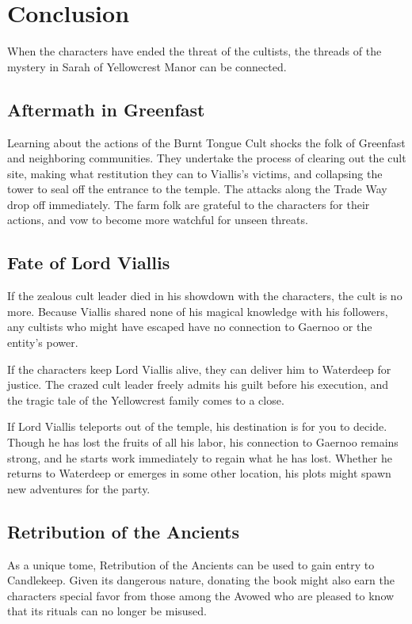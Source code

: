 \documentclass[10pt,a4paper,twoside,bg=print,twocolumn,openany,nodeprecatedcode]{dndbook}
\begin{document}
\section{Conclusion}
When the characters have ended the threat of the cultists, the threads of the mystery in Sarah of Yellowcrest Manor can be connected.

\subsection{Aftermath in Greenfast}
Learning about the actions of the Burnt Tongue Cult shocks the folk of Greenfast and neighboring communities. They undertake the process of clearing out the cult site, making what restitution they can to Viallis's victims, and collapsing the tower to seal off the entrance to the temple. The attacks along the Trade Way drop off immediately. The farm folk are grateful to the characters for their actions, and vow to become more watchful for unseen threats.

\subsection{Fate of Lord Viallis}
If the zealous cult leader died in his showdown with the characters, the cult is no more. Because Viallis shared none of his magical knowledge with his followers, any cultists who might have escaped have no connection to Gaernoo or the entity's power.

If the characters keep Lord Viallis alive, they can deliver him to Waterdeep for justice. The crazed cult leader freely admits his guilt before his execution, and the tragic tale of the Yellowcrest family comes to a close.

If Lord Viallis teleports out of the temple, his destination is for you to decide. Though he has lost the fruits of all his labor, his connection to Gaernoo remains strong, and he starts work immediately to regain what he has lost. Whether he returns to Waterdeep or emerges in some other location, his plots might spawn new adventures for the party.

\subsection{Retribution of the Ancients}
As a unique tome, Retribution of the Ancients can be used to gain entry to Candlekeep. Given its dangerous nature, donating the book might also earn the characters special favor from those among the Avowed who are pleased to know that its rituals can no longer be misused.
\end{document}

